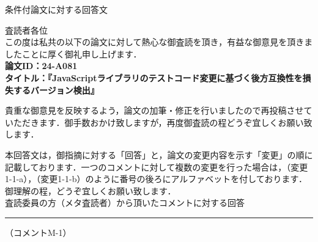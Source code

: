 \documentclass{jarticle} %
\def\restitle{条件付論文に対する回答文}
\def\section#1{ \vspace{3pc} {\large \gt #1} \vspace{1pc} \hrule }
\def\subsection#1{ \vspace{1pc} {\gt #1} }
\begin{document}
{\Large \gt \restitle}

\vspace{3pc}

査読者各位\\


この度は私共の以下の論文に対して熱心な御査読を頂き，有益な御意見を頂きましたことに厚く御礼申し上げます．\\
\textbf{論文ID：24-A081}\\
\textbf{タイトル：『JavaScriptライブラリのテストコード変更に基づく後方互換性を損失するバージョン検出』}

貴重な御意見を反映するよう，論文の加筆・修正を行いましたので再投稿させていただきます．御手数おかけ致しますが，再度御査読の程どうぞ宜しくお願い致します．	

本回答文は，御指摘に対する「回答」と，論文の変更内容を示す「変更」の順に記載しております．一つのコメントに対して複数の変更を行った場合は，（変更1-1-a），（変更1-1-b）のように番号の後ろにアルファベットを付しております．御理解の程，どうぞ宜しくお願い致します．\\


\section{査読委員の方（メタ査読者）から頂いたコメントに対する回答}

\subsection{（コメントM-1）}
\end{document}
